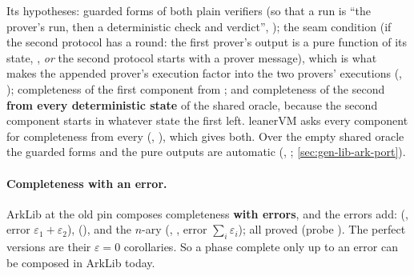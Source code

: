 
Its hypotheses: guarded forms of both plain verifiers (so that a run is \enquote{the prover's run,
then a deterministic check and verdict}, ); the seam condition
 (if the second protocol has a round: the first prover's output is a pure function of
its state, , \emph{or} the second protocol starts with a prover message),
which is what makes the appended prover's execution factor into the two provers' executions
(\allowbreak{}, \allowbreak{}); completeness
of the first component from ; and completeness of the second \textbf{from every
deterministic state } of the shared oracle, because the second component starts in
whatever state the first left. leanerVM asks every component for completeness from every
 (, ), which gives both. Over the
empty shared oracle the guarded forms and the pure outputs are automatic
(\allowbreak{}\allowbreak{}, \allowbreak{};
\cref{sec:gen-lib-ark-port}).

\paragraph{Completeness with an error.} ArkLib at the old pin composes completeness \textbf{with
errors}, and the errors add: \allowbreak{}\allowbreak{}\allowbreak{}\allowbreak{}
(, error $\varepsilon_1 + \varepsilon_2$),
\allowbreak{}\allowbreak{}\allowbreak{}\allowbreak{} (),
and the $n$-ary \allowbreak{}\allowbreak{}\allowbreak{} (,
, error $\sum_i \varepsilon_i$); all proved (probe
). The perfect versions are their $\varepsilon = 0$ corollaries. So a
phase complete only up to an error can be composed in ArkLib today.

